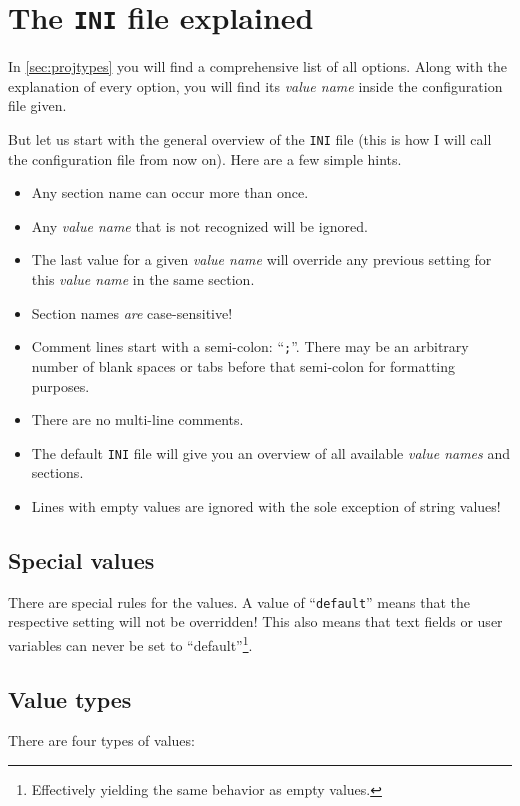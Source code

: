 \documentclass[a4paper,titlepage]{report}
\begin{document}
\section{The \texttt{INI} file explained}
In \autoref{sec:projtypes} you will find a comprehensive list of all options.
Along with the explanation of every option, you will find its \emph{value name} inside the
configuration file given.

But let us start with the general overview of the \texttt{INI} file (this is how I will call
the configuration file from now on). Here are a few simple hints.
\begin{itemize}
  \item Any section name can occur more than once.
  \item Any \emph{value name} that is not recognized will be ignored.
  \item The last value for a given \emph{value name} will override any previous setting for this \emph{value name} in the same section.
  \item Section names \emph{are} case-sensitive!
  \item Comment lines start with a semi-colon: ``\verb+;+''. There may be an arbitrary number of blank spaces or tabs before that semi-colon for formatting purposes.
  \item There are no multi-line comments.
  \item The default \texttt{INI} file will give you an overview of all available \emph{value names} and sections.
  \item Lines with empty values are ignored with the sole exception of string values!
\end{itemize}

\subsection{Special values}
There are special rules for the values. A value of ``\texttt{default}'' means that
the respective setting will not be overridden! This also means that text fields or
user variables can never be set to ``default''\footnote{Effectively yielding the
same behavior as empty values.}.

\subsection{Value types}
There are four types of values:
\end{document}
